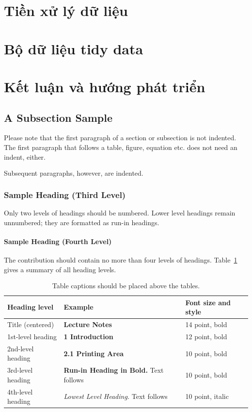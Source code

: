 \documentclass[runningheads]{llncs}
\begin{document}
\section{Tiền xử lý dữ liệu}

\section{Bộ dữ liệu tidy data}

\section{Kết luận và hướng phát triển}
\subsection{A Subsection Sample}
Please note that the first paragraph of a section or subsection is
not indented. The first paragraph that follows a table, figure,
equation etc. does not need an indent, either.

Subsequent paragraphs, however, are indented.

\subsubsection{Sample Heading (Third Level)} Only two levels of
headings should be numbered. Lower level headings remain unnumbered;
they are formatted as run-in headings.

\paragraph{Sample Heading (Fourth Level)}
The contribution should contain no more than four levels of
headings. Table~\ref{tab1} gives a summary of all heading levels.

\begin{table}
\caption{Table captions should be placed above the
tables.}\label{tab1}
\begin{tabular}{|l|l|l|}
\hline
Heading level &  Example & Font size and style\\
\hline
Title (centered) &  {\Large\bfseries Lecture Notes} & 14 point, bold\\
1st-level heading &  {\large\bfseries 1 Introduction} & 12 point, bold\\
2nd-level heading & {\bfseries 2.1 Printing Area} & 10 point, bold\\
3rd-level heading & {\bfseries Run-in Heading in Bold.} Text follows & 10 point, bold\\
4th-level heading & {\itshape Lowest Level Heading.} Text follows & 10 point, italic\\
\hline
\end{tabular}
\end{table}
\end{document}
